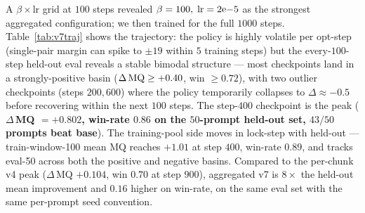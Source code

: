 \documentclass{article}
\begin{document}
A $\beta\times\text{lr}$ grid at $100$ steps revealed $\beta=100,\;{\rm lr}=2{\rm e}{-}5$ as the strongest aggregated configuration; we then trained for the full $1000$ steps. Table~\ref{tab:v7traj} shows the trajectory: the policy is highly volatile per opt-step (single-pair margin can spike to $\pm 19$ within $5$ training steps) but the every-$100$-step held-out eval reveals a stable bimodal structure — most checkpoints land in a strongly-positive basin ($\Delta\,{\rm MQ}\ge+0.40$, win $\ge0.72$), with two outlier checkpoints (steps $200, 600$) where the policy temporarily collapses to $\Delta\approx-0.5$ before recovering within the next $100$ steps. The step-$400$ checkpoint is the peak (\textbf{$\Delta$\,MQ $=+0.802$, win-rate $0.86$ on the $50$-prompt held-out set, $43/50$ prompts beat base}). The training-pool side moves in lock-step with held-out — train-window-100 mean MQ reaches $+1.01$ at step $400$, win-rate $0.89$, and tracks eval-50 across both the positive and negative basins. Compared to the per-chunk v4 peak ($\Delta$\,MQ $+0.104$, win $0.70$ at step $900$), aggregated v7 is $8\times$ the held-out mean improvement and $0.16$ higher on win-rate, on the same eval set with the same per-prompt seed convention.
\end{document}
